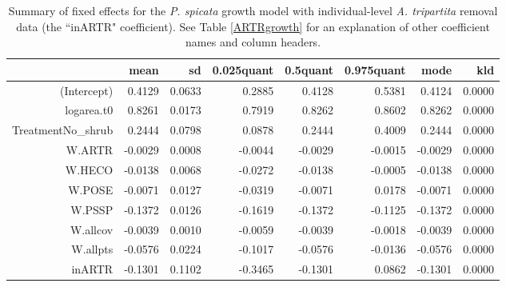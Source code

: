 \documentclass[11pt]{article}
\begin{document}
\begin{table}
\centering
\caption{Summary of fixed effects for the \textit{P. spicata} growth model with individual-level \textit{A. tripartita} removal data (the ``inARTR" coefficient). See Table \ref{ARTRgrowth} for an explanation of other coefficient names and column headers.} 
\label{table:PSSPgrowth-inARTR}
\begin{tabular}{rrrrrrrr}
  \hline
 & mean & sd & 0.025quant & 0.5quant & 0.975quant & mode & kld \\ 
  \hline
(Intercept) & 0.4129 & 0.0633 & 0.2885 & 0.4128 & 0.5381 & 0.4124 & 0.0000 \\ 
  logarea.t0 & 0.8261 & 0.0173 & 0.7919 & 0.8262 & 0.8602 & 0.8262 & 0.0000 \\ 
  TreatmentNo\_shrub & 0.2444 & 0.0798 & 0.0878 & 0.2444 & 0.4009 & 0.2444 & 0.0000 \\ 
  W.ARTR & -0.0029 & 0.0008 & -0.0044 & -0.0029 & -0.0015 & -0.0029 & 0.0000 \\ 
  W.HECO & -0.0138 & 0.0068 & -0.0272 & -0.0138 & -0.0005 & -0.0138 & 0.0000 \\ 
  W.POSE & -0.0071 & 0.0127 & -0.0319 & -0.0071 & 0.0178 & -0.0071 & 0.0000 \\ 
  W.PSSP & -0.1372 & 0.0126 & -0.1619 & -0.1372 & -0.1125 & -0.1372 & 0.0000 \\ 
  W.allcov & -0.0039 & 0.0010 & -0.0059 & -0.0039 & -0.0018 & -0.0039 & 0.0000 \\ 
  W.allpts & -0.0576 & 0.0224 & -0.1017 & -0.0576 & -0.0136 & -0.0576 & 0.0000 \\ 
  inARTR & -0.1301 & 0.1102 & -0.3465 & -0.1301 & 0.0862 & -0.1301 & 0.0000 \\ 
   \hline
\end{tabular}
\end{table}
\end{document}
